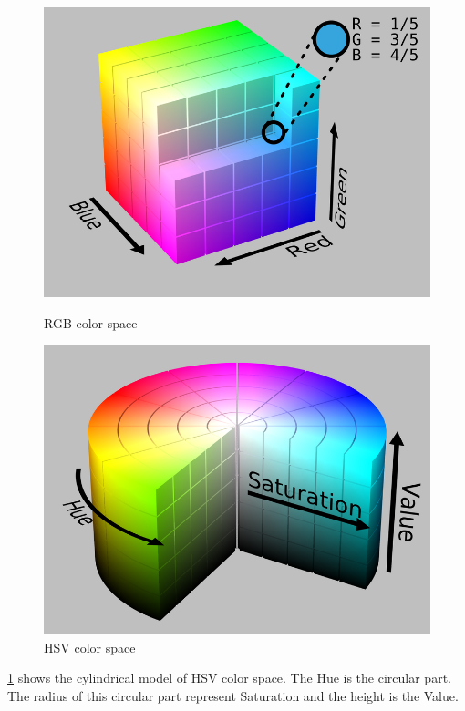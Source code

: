 \begin{figure}[htbp]
\begin{minipage}[t]{0.45\linewidth}
    \includegraphics[width=\linewidth]{images/RGB.png}
    \caption{RGB color space}
    \label{f:rgb}
\end{minipage}
    \hfill
\begin{minipage}[t]{0.45\linewidth}
    \includegraphics[width=\linewidth]{images/HSV.png}
    \caption{HSV color space}
    \label{f:hsv}
\end{minipage} 
\end{figure}

\ref{f:hsv} shows the cylindrical model of HSV color space.
The Hue is the circular part.
The radius of this circular part represent Saturation and the height is the Value.

